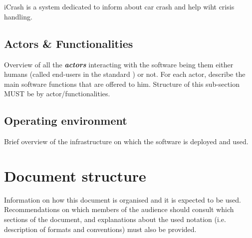 \section{\mysystemname}
iCrash is a system dedicated to inform about car crash and help wiht crisis
handling.


\subsection{Actors \& Functionalities}
Overview of all the \textbf{\emph{\glspl{actor}}} interacting with the software
being them either humans (called end-users in the standard
\cite{IEEE-2001-userdocumentation}) or not. For each actor, describe the main
software functions that are offered to him. Structure of this sub-section MUST
be by actor/functionalities.


\subsection{Operating environment}
Brief overview of the infrastructure on which the software is deployed and used.

\section{Document structure}  
Information on how this document is organised and it is expected to be
used. Recommendations on which members of the audience
should consult which sections of the document, and explanations about the used
notation (i.e. description of formats and conventions) must also be provided.





